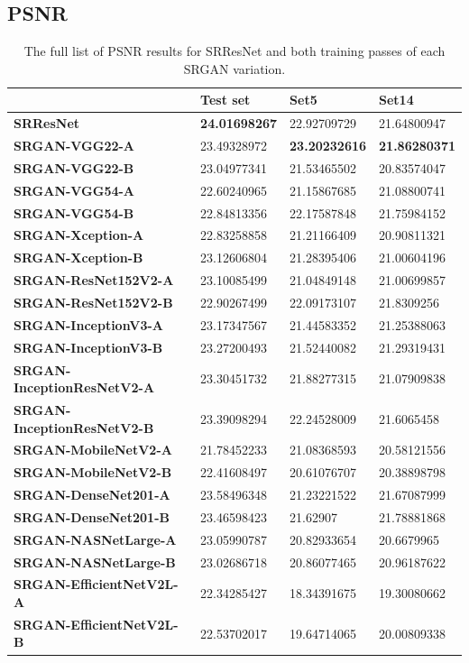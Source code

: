 \begin{appendices}
\section{PSNR}
\begin{table}[h!]
    \centering
    \begin{tabular}{llll}
        \toprule
        \textbf{} & \textbf{Test set} & \textbf{Set5} & \textbf{Set14} \\
        \midrule
        \textbf{SRResNet} & \textbf{24.01698267} & 22.92709729 & 21.64800947 \\ 
        \textbf{SRGAN-VGG22-A} & 23.49328972 & \textbf{23.20232616} & \textbf{21.86280371} \\ 
        \textbf{SRGAN-VGG22-B} & 23.04977341 & 21.53465502 & 20.83574047 \\ 
        \textbf{SRGAN-VGG54-A} & 22.60240965 & 21.15867685 & 21.08800741 \\ 
        \textbf{SRGAN-VGG54-B} & 22.84813356 & 22.17587848 & 21.75984152 \\ 
        \textbf{SRGAN-Xception-A} & 22.83258858 & 21.21166409 & 20.90811321 \\ 
        \textbf{SRGAN-Xception-B} & 23.12606804 & 21.28395406 & 21.00604196 \\ 
        \textbf{SRGAN-ResNet152V2-A} & 23.10085499 & 21.04849148 & 21.00699857 \\ 
        \textbf{SRGAN-ResNet152V2-B} & 22.90267499 & 22.09173107 & 21.8309256 \\ 
        \textbf{SRGAN-InceptionV3-A} & 23.17347567 & 21.44583352 & 21.25388063 \\ 
        \textbf{SRGAN-InceptionV3-B} & 23.27200493 & 21.52440082 & 21.29319431 \\ 
        \textbf{SRGAN-InceptionResNetV2-A} & 23.30451732 & 21.88277315 & 21.07909838 \\ 
        \textbf{SRGAN-InceptionResNetV2-B} & 23.39098294 & 22.24528009 & 21.6065458 \\ 
        \textbf{SRGAN-MobileNetV2-A} & 21.78452233 & 21.08368593 & 20.58121556 \\ 
        \textbf{SRGAN-MobileNetV2-B} & 22.41608497 & 20.61076707 & 20.38898798 \\ 
        \textbf{SRGAN-DenseNet201-A} & 23.58496348 & 21.23221522 & 21.67087999 \\ 
        \textbf{SRGAN-DenseNet201-B} & 23.46598423 & 21.62907 & 21.78881868 \\ 
        \textbf{SRGAN-NASNetLarge-A} & 23.05990787 & 20.82933654 & 20.6679965 \\ 
        \textbf{SRGAN-NASNetLarge-B} & 23.02686718 & 20.86077465 & 20.96187622 \\ 
        \textbf{SRGAN-EfficientNetV2L-A} & 22.34285427 & 18.34391675 & 19.30080662 \\ 
        \textbf{SRGAN-EfficientNetV2L-B} & 22.53702017 & 19.64714065 & 20.00809338 \\
        \bottomrule
    \end{tabular}
    \caption{The full list of PSNR results for SRResNet and both training passes of each SRGAN variation.}
\end{table}


\end{appendices}
